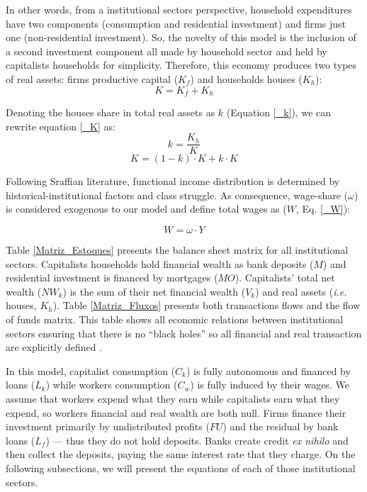 \documentclass[12pt]{article}
\begin{document}
In other words, from a institutional sectors perspective, household expenditures have two components (consumption and residential investment) and firms just one (non-residential investment).
So, the novelty of this model is the inclusion of a second investment component all made by household sector and held by capitalists households for simplicity. 
Therefore, this economy produces two types of real assets: firms productive capital (\(K_f\)) and households houses (\(K_h\)):
\begin{equation}
    \label{_K}
    K = K_f + K_h
\end{equation}

Denoting the houses share in total real assets as \(k\) (Equation \ref{_k}), we can rewrite equation \ref{_K} as:
\begin{equation}
\label{_k}
    k = \frac{K_h}{K}
\end{equation}
$$
K = (1-k)\cdot K + k\cdot K
$$

Following Sraffian literature, functional income distribution is determined by historical-institutional factors and class struggle.
As consequence, wage-share (\(\omega\)) is considered exogenous to our model and define total wages as (\(W\), Eq. \ref{_W}):

\begin{equation}
\label{_W}
    W = \omega\cdot Y
\end{equation}

Table \ref{Matriz_Estoques} presents the balance sheet matrix for all institutional sectors. 
Capitalists households hold financial wealth as bank deposits (\(M\)) and residential investment is financed by mortgages (\(MO\)).
Capitalists' total net wealth (\(NW_{k}\)) is the sum of their net financial wealth (\(V_{k}\)) and real assets (\textit{i.e.} houses, \(K_h\)).
Table  \ref{Matriz_Fluxos} presents both transactions flows and the flow of funds matrix. 
This table shows all economic relations between institutional sectors ensuring that there is no  ``black holes''
so all financial and real transaction are explicitly defined \cite{godley_monetary_2007,macedo_e_silva_peering_2011}.

In this model, capitalist consumption (\(C_k\)) is fully autonomous and financed by loans (\(L_{k}\)) while workers consumption (\(C_w\)) is fully induced by their wages.
We assume that workers expend what they earn while capitalists earn what they expend, so workers financial and real wealth are both null.
Firms finance their investment primarily by undistributed profits (\(FU\)) and the residual by bank loans (\(L_f\)) --- thus they do not hold deposits. 
Banks create credit \textit{ex nihilo} and then collect the deposits, paying the same interest rate that they charge.
On the following subsections, we will present the equations of each of those institutional sectors.
\end{document}
